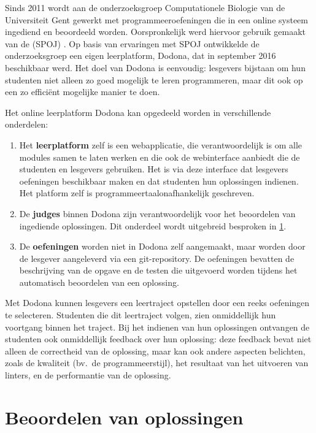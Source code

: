 Sinds 2011 wordt aan de onderzoeksgroep Computationele Biologie van de Universiteit Gent gewerkt met programmeeroefeningen die in een online systeem ingediend en beoordeeld worden.
Oorspronkelijk werd hiervoor gebruik gemaakt van de  (SPOJ) \autocite{10.1007/978-3-540-78139-4_31}.
Op basis van ervaringen met SPOJ ontwikkelde de onderzoeksgroep een eigen leerplatform, Dodona, dat in september 2016 beschikbaar werd.
Het doel van Dodona is eenvoudig: lesgevers bijstaan om hun studenten niet alleen zo goed mogelijk te leren programmeren, maar dit ook op een zo efficiënt mogelijke manier te doen.

Het online leerplatform Dodona kan opgedeeld worden in verschillende onderdelen:
\begin{enumerate}
    \item Het \textbf{leerplatform} zelf is een webapplicatie, die verantwoordelijk is om alle modules samen te laten werken en die ook de webinterface aanbiedt die de studenten en lesgevers gebruiken.
    Het is via deze interface dat lesgevers oefeningen beschikbaar maken en dat studenten hun oplossingen indienen.
    Het platform zelf is programmeertaalonafhankelijk geschreven.
    \item De \textbf{judges} binnen Dodona zijn verantwoordelijk voor het beoordelen van ingediende oplossingen.
    Dit onderdeel wordt uitgebreid besproken in \cref{sec:evalueren-van-een-oplossing}.
    \item De \textbf{oefeningen} worden niet in Dodona zelf aangemaakt, maar worden door de lesgever aangeleverd via een git-repository.
    De oefeningen bevatten de beschrijving van de opgave en de testen die uitgevoerd worden tijdens het automatisch beoordelen van een oplossing.
\end{enumerate}

Met Dodona kunnen lesgevers een leertraject opstellen door een reeks oefeningen te selecteren.
Studenten die dit leertraject volgen, zien onmiddellijk hun voortgang binnen het traject.
Bij het indienen van hun oplossingen ontvangen de studenten ook onmiddellijk feedback over hun oplossing: deze feedback bevat niet alleen de correctheid van de oplossing, maar kan ook andere aspecten belichten, zoals de kwaliteit (bv.\ de programmeerstijl), het resultaat van het uitvoeren van linters, en de performantie van de oplossing.

\section{Beoordelen van oplossingen}\label{sec:evalueren-van-een-oplossing}

